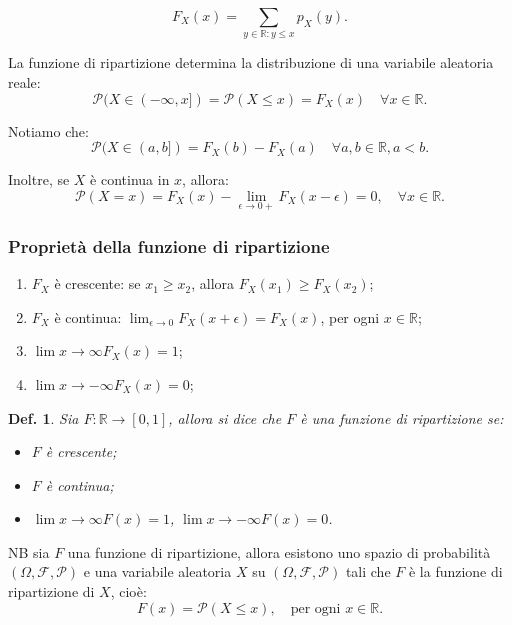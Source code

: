 \documentclass{article}
\newtheorem{definition}{Def.}[section]
\begin{document}
\begin{equation*}
	F_X(x) = \sum_{y \in \mathbb{R}: y \leq x} p_X(y).
\end{equation*}

La funzione di ripartizione determina la distribuzione di una variabile
aleatoria reale:
\begin{equation*}
	\mathcal{P}(X \in (-\infty, x]) = \mathcal{P}(X \leq x) = F_X(x) \quad \forall
	x \in \mathbb{R}.
\end{equation*}

Notiamo che:
\begin{equation*}
	\mathcal{P}(X \in (a, b]) = F_X(b) - F_X(a) \quad \forall a, b \in
	\mathbb{R}, a < b.
\end{equation*}

Inoltre, se $X$ è continua in $x$, allora:
\begin{equation*}
	\mathcal{P}(X = x) = F_X(x) - \lim_{\epsilon \to 0+} F_X(x - \epsilon) = 0, \quad
	\forall x \in \mathbb{R}.
\end{equation*}

\subsubsection{Proprietà della funzione di ripartizione}
\begin{enumerate}
	\item $F_X$ è crescente: se $x_1 \geq x_2$, allora $F_X(x_1) \geq F_X(x_2)$;

	\item $F_X$ è continua: $\lim_{\epsilon \to 0} F_X(x + \epsilon) =
	F_X(x)$, per ogni $x \in \mathbb{R}$;

	\item $\lim{x \to \infty} F_X(x) = 1$;

	\item $\lim{x \to -\infty} F_X(x) = 0$;
\end{enumerate}

\begin{definition}
	Sia $F: \mathbb{R} \to [0, 1]$, allora si dice che $F$ è una funzione di
	ripartizione se:
	\begin{itemize}
		\item $F$ è crescente;

		\item $F$ è continua;

		\item $\lim{x \to \infty} F(x) = 1$, $\lim{x \to -\infty} F(x) = 0$.
	\end{itemize}
\end{definition}
NB sia $F$ una funzione di ripartizione, allora esistono uno spazio di probabilità
$(\Omega, \mathcal{F, P})$ e una variabile aleatoria $X$ su $(\Omega,
\mathcal{F, P})$ tali che $F$ è la funzione di ripartizione di $X$, cioè:
\begin{equation*}
	F(x) = \mathcal{P}(X \leq x), \quad \text{per ogni } x \in \mathbb{R}.
\end{equation*}
\end{document}
